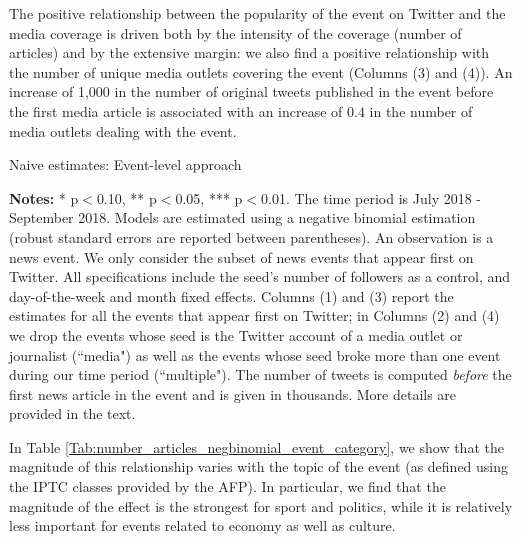 The positive relationship between the popularity of the event on Twitter and the media coverage is driven both by the intensity of the coverage (number of articles) and by the extensive margin: we also find a positive relationship with the number of unique media outlets covering the event (Columns (3) and (4)). An increase of 1,000 in the number of original tweets published in the event before the first media article is associated with an increase of $0.4$ in the number of media outlets dealing with the event.


\begin{table}
\caption{Naive estimates: Event-level approach}
\begin{center}
	
\end{center}
\begin{spacing}{0.5}
	{\fns \textbf{Notes:} * p$<$0.10, ** p$<$0.05, *** p$<$0.01. The time period is July 2018 - September 2018.  Models are estimated using a negative binomial estimation (robust standard errors are reported between parentheses). An observation is a news event. We only consider the subset of news events that appear first on Twitter. All specifications include the seed's number of followers as a control, and day-of-the-week and month fixed effects. Columns (1) and (3) report the estimates for all the events that appear first on Twitter; in Columns (2) and (4) we drop the events whose seed is the Twitter account of a media outlet or journalist (``media") as well as the events whose seed broke more than one event during our time period (``multiple"). The number of tweets is computed \textit{before} the first news article in the event and is given in thousands. More details are provided in the text.} 
\end{spacing}
\label{Tab:number_articles_negbinomial_event}
\end{table} 


In Table \ref{Tab:number_articles_negbinomial_event_category}, we show that the magnitude of this relationship varies with the topic of the event (as defined using the IPTC classes provided by the AFP). In particular, we find that the magnitude of the effect is the strongest for sport and politics, while it is relatively less important for events related to economy as well as culture.


